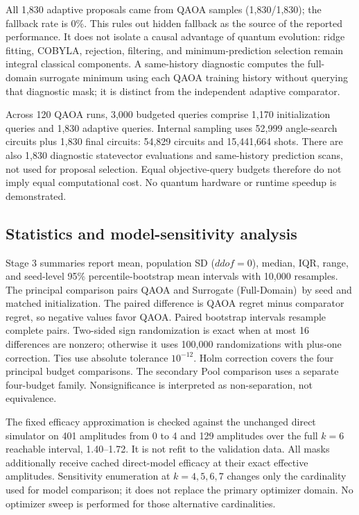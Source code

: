 \documentclass[11pt,letterpaper]{article}
\newcommand{\fd}{Surrogate (Full-Domain)}
\begin{document}
All 1,830 adaptive proposals came from QAOA samples (1,830/1,830); the fallback rate is 0\%. This rules out hidden fallback as the source of the reported performance. It does not isolate a causal advantage of quantum evolution: ridge fitting, COBYLA, rejection, filtering, and minimum-prediction selection remain integral classical components. A same-history diagnostic computes the full-domain surrogate minimum using each QAOA training history without querying that diagnostic mask; it is distinct from the independent adaptive comparator.

Across 120 QAOA runs, 3,000 budgeted queries comprise 1,170 initialization queries and 1,830 adaptive queries. Internal sampling uses 52,999 angle-search circuits plus 1,830 final circuits: 54,829 circuits and 15,441,664 shots. There are also 1,830 diagnostic statevector evaluations and same-history prediction scans, not used for proposal selection. Equal objective-query budgets therefore do not imply equal computational cost. No quantum hardware or runtime speedup is demonstrated.

\subsection{Statistics and model-sensitivity analysis}
Stage 3 summaries report mean, population SD ($ddof=0$), median, IQR, range, and seed-level 95\% percentile-bootstrap mean intervals with 10,000 resamples. The principal comparison pairs QAOA and \fd\ by seed and matched initialization. The paired difference is QAOA regret minus comparator regret, so negative values favor QAOA. Paired bootstrap intervals resample complete pairs. Two-sided sign randomization is exact when at most 16 differences are nonzero; otherwise it uses 100,000 randomizations with plus-one correction. Ties use absolute tolerance $10^{-12}$. Holm correction covers the four principal budget comparisons. The secondary Pool comparison uses a separate four-budget family. Nonsignificance is interpreted as non-separation, not equivalence.

The fixed efficacy approximation is checked against the unchanged direct simulator on 401 amplitudes from 0 to 4 and 129 amplitudes over the full $k=6$ reachable interval, 1.40--1.72. It is not refit to the validation data. All masks additionally receive cached direct-model efficacy at their exact effective amplitudes. Sensitivity enumeration at $k=4,5,6,7$ changes only the cardinality used for model comparison; it does not replace the primary optimizer domain. No optimizer sweep is performed for those alternative cardinalities.
\end{document}
